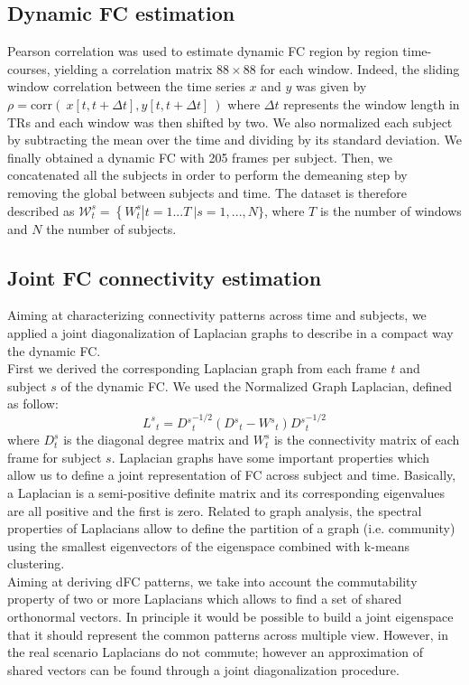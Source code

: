 \documentclass[review]{elsarticle}
\begin{document}
\subsection{Dynamic FC estimation}
Pearson correlation was used to estimate dynamic FC region by region time-courses, yielding a correlation matrix $88 \times 88$ for each window.
Indeed, the sliding window correlation between the time series $x$ and $y$ was given by $\rho = \mbox{corr}(\ x[t,t+\Delta t], y[t,t+\Delta t] \ )$ where $\Delta t$ represents the window length in TRs and each window was then shifted by two.
We also normalized each subject by subtracting the mean over the time and dividing by its standard deviation.
We finally obtained a dynamic FC with 205 frames per subject.
Then, we concatenated all the subjects in order to perform the demeaning step by removing the global between subjects and time. The dataset is therefore described as $\mathcal{W}^s_t = \left \{ W^s_{t} \right  | t = 1...T \ | s = 1,...,N \}$, where $T$ is the number of windows and $N$ the number of subjects.  


\subsection{Joint FC connectivity estimation}
Aiming at characterizing connectivity patterns across time and subjects, we applied a joint diagonalization of Laplacian graphs to describe in a compact way the dynamic FC.\\
First we derived the corresponding Laplacian graph from each frame $t$ and subject $s$ of the dynamic FC. We used the Normalized Graph Laplacian, defined as follow:
\begin{equation}
L^s{_t} = D{^s}_{t}^{-1/2}(D{^s}_t -W{^s}_t)D{^s}_{t}^{-1/2}
\end{equation}
where $D^s_t$ is the diagonal degree matrix  and $W^s_t$ is the connectivity matrix of each frame for subject $s$. Laplacian graphs have some important properties which allow us to define a joint representation of FC across subject and time.
Basically, a Laplacian is a semi-positive definite matrix and its corresponding eigenvalues are all positive and the first is zero.
Related to graph analysis, the spectral properties of Laplacians allow to define the partition of a graph (i.e. community) using the smallest eigenvectors of the eigenspace combined with k-means clustering.\\
Aiming at deriving dFC patterns, we take into account the commutability property of two or more Laplacians which allows to find a set of shared orthonormal vectors. In principle it would be possible to build a joint eigenspace that it should represent the common patterns across multiple view.
However, in the real scenario Laplacians do not commute; however an approximation of shared vectors can be found through a joint diagonalization procedure.\\
\end{document}

